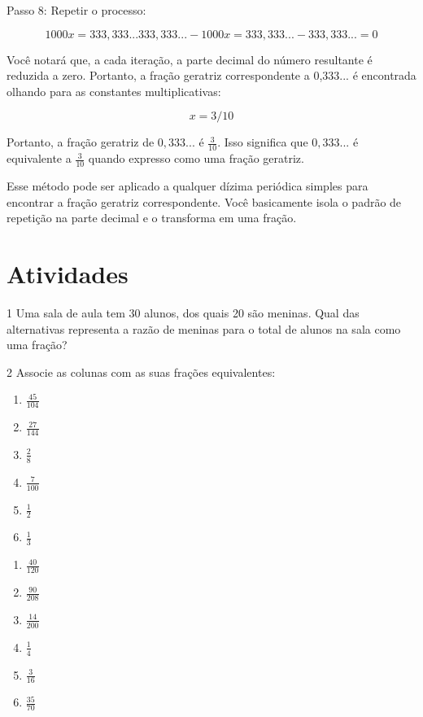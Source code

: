 {Passo 8: Repetir o processo: 

$$1000x = 333,333... 333,333... - 1000x = 333,333... - 333,333... = 0$$

Você notará que, a cada iteração, a parte decimal do número resultante é
reduzida a zero. Portanto, a fração geratriz correspondente a 0,333... é
encontrada olhando para as constantes multiplicativas:

$$x = 3 / 10$$

Portanto, a fração geratriz de $0,333...$ é $\frac{3}{10}$. Isso significa que $0,333...$ é
equivalente a $\frac{3}{10}$ quando expresso como uma fração geratriz.

Esse método pode ser aplicado a qualquer dízima periódica simples para
encontrar a fração geratriz correspondente. Você basicamente isola o padrão
de repetição na parte decimal e o transforma em uma fração.
} %

\section*{Atividades}

\num{1} Uma sala de aula tem 30 alunos, dos quais 20 são meninas. Qual das
alternativas representa a razão de meninas para o total de alunos na
sala como uma fração?


\num{2} Associe as colunas com as suas frações equivalentes:
\begin{multicols}{2}
\begin{enumerate}[label=(\alph*)]
\item  $\frac{45}{104}$ 
\item  $\frac{27}{144}$ 
\item  $\frac{2}{8}$    
\item  $\frac{7}{100}$  
\item  $\frac{1}{2}$    
\item  $\frac{1}{3}$    
\end{enumerate}
\begin{enumerate}[label=(\quad)]
\item $\frac{40}{120}$
\item $\frac{90}{208}$
\item $\frac{14}{200}$
\item $\frac{1}{4}$
\item $\frac{3}{16}$
\item $\frac{35}{70}$
\end{enumerate}
\end{multicols}

